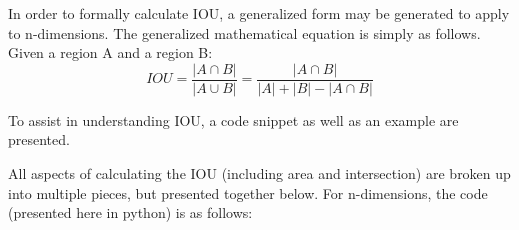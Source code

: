 In order to formally calculate IOU, a generalized form may be generated to apply to n-dimensions. The generalized mathematical equation is simply as follows. Given a region A and a region B: 
\begin{equation}
IOU = \frac{|A\cap B|}{|A\cup B|} = \frac{|A\cap B|}{|A|+|B|- |A\cap B|}
\end{equation}

To assist in understanding IOU, a code snippet as well as an example are presented.

All aspects of calculating the IOU (including area and intersection) are broken up into multiple pieces, but presented together below. For n-dimensions, the code (presented here in python) is as follows: 


%
%
%
%
%
%












